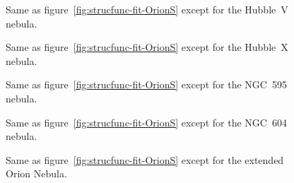 \documentclass[fleqn,usenatbib, useAMS, a4paper]{mnras}
\begin{document}
\begin{figure}
  \centering
  \caption{
    Same as figure~\ref{fig:strucfunc-fit-OrionS} except for the Hubble~V nebula.
  }
  \label{fig:strucfunc-fit-HV}
\end{figure}
\begin{figure}
  \centering
  \caption{
    Same as figure~\ref{fig:strucfunc-fit-OrionS} except for the Hubble~X nebula.
  }
  \label{fig:strucfunc-fit-HX}
\end{figure}

\begin{figure}
  \centering
  \caption{
    Same as figure~\ref{fig:strucfunc-fit-OrionS} except for the NGC~595 nebula.
  }
  \label{fig:strucfunc-fit-N595}
\end{figure}
\begin{figure}
  \centering
  \caption{
    Same as figure~\ref{fig:strucfunc-fit-OrionS} except for the NGC~604 nebula.
  }
  \label{fig:strucfunc-fit-N604H}
\end{figure}

\begin{figure}
  \centering
  \caption{
    Same as figure~\ref{fig:strucfunc-fit-OrionS} except for the extended Orion Nebula.
  }
  \label{fig:strucfunc-fit-OrionLH}
\end{figure}




\end{document}

